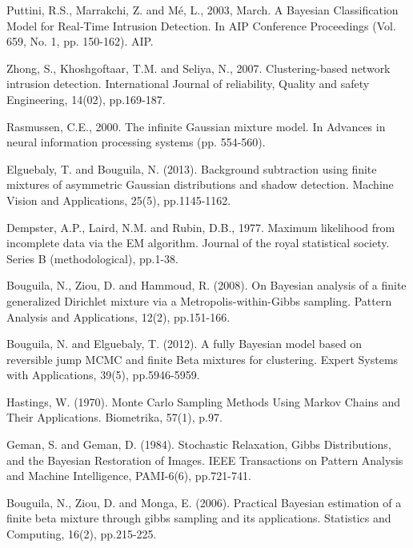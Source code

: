 \documentclass[conference]{llncs}
\begin{document}
\begin{thebibliography}{[MT1]}
 Puttini, R.S., Marrakchi, Z. and Mé, L., 2003, March. A Bayesian Classification Model for Real‐Time Intrusion Detection. In AIP Conference Proceedings (Vol. 659, No. 1, pp. 150-162). AIP.

 Zhong, S., Khoshgoftaar, T.M. and Seliya, N., 2007. Clustering-based network intrusion detection. International Journal of reliability, Quality and safety Engineering, 14(02), pp.169-187.

 Rasmussen, C.E., 2000. The infinite Gaussian mixture model. In Advances in neural information processing systems (pp. 554-560).


 Elguebaly, T. and Bouguila, N. (2013). Background subtraction using finite mixtures of asymmetric Gaussian distributions and shadow detection. Machine Vision and Applications, 25(5), pp.1145-1162.

 Dempster, A.P., Laird, N.M. and Rubin, D.B., 1977. Maximum likelihood from incomplete data via the EM algorithm. Journal of the royal statistical society. Series B (methodological), pp.1-38.

 Bouguila, N., Ziou, D. and Hammoud, R. (2008). On Bayesian analysis of a finite generalized Dirichlet mixture via a Metropolis-within-Gibbs sampling. Pattern Analysis and Applications, 12(2), pp.151-166.

 Bouguila, N. and Elguebaly, T. (2012). A fully Bayesian model based on reversible jump MCMC and finite Beta mixtures for clustering. Expert Systems with Applications, 39(5), pp.5946-5959.

 Hastings, W. (1970). Monte Carlo Sampling Methods Using Markov Chains and Their Applications. Biometrika, 57(1), p.97.

 Geman, S. and Geman, D. (1984). Stochastic Relaxation, Gibbs Distributions, and the Bayesian Restoration of Images. IEEE Transactions on Pattern Analysis and Machine Intelligence, PAMI-6(6), pp.721-741.

 Bouguila, N., Ziou, D. and Monga, E. (2006). Practical Bayesian estimation of a finite beta mixture through gibbs sampling and its applications. Statistics and Computing, 16(2), pp.215-225.


\end{thebibliography}
\end{document}
